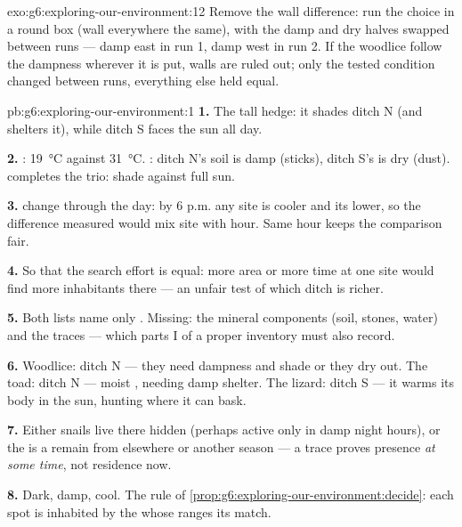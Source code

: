 \begin{solution}{exo:g6:exploring-our-environment:12}
Remove the wall difference: run the choice in a round box
(wall everywhere the same), with the damp and dry halves
swapped between runs --- damp east in run 1, damp west in
run 2. If the woodlice follow the dampness wherever it is
put, walls are ruled out; only the tested condition changed
between runs, everything else held equal.
\end{solution}

\begin{solution}{pb:g6:exploring-our-environment:1}
\textbf{1.} The tall hedge: it shades ditch N (and shelters
it), while ditch S faces the sun all day.

\textbf{2.} : \qty{19}{\degreeCelsius} against
\qty{31}{\degreeCelsius}. : ditch N's soil is damp
(sticks), ditch S's is dry (dust).  completes the trio:
shade against full sun.

\textbf{3.}  change through the day: by 6 p.m. any
site is cooler and its  lower, so the difference
measured would mix site with hour. Same hour keeps the
comparison fair.

\textbf{4.} So that the search effort is equal: more area or
more time at one site would find more inhabitants there ---
an unfair test of which ditch is richer.

\textbf{5.} Both lists name only . Missing:
the mineral components (soil, stones, water) and the traces
--- which parts I of a proper inventory must also record.

\textbf{6.} Woodlice: ditch N --- they need dampness and
shade or they dry out. The toad: ditch N --- moist ,
needing damp shelter. The lizard: ditch S --- it warms its
body in the sun, hunting where it can bask.

\textbf{7.} Either snails live there hidden (perhaps active
only in damp night hours), or the  is a remain from
elsewhere or another season --- a trace proves presence
\emph{at some time}, not residence now.

\textbf{8.} Dark, damp, cool. The rule of
\cref{prop:g6:exploring-our-environment:decide}: each spot
is inhabited by the  whose ranges its 
match.


\end{solution}
